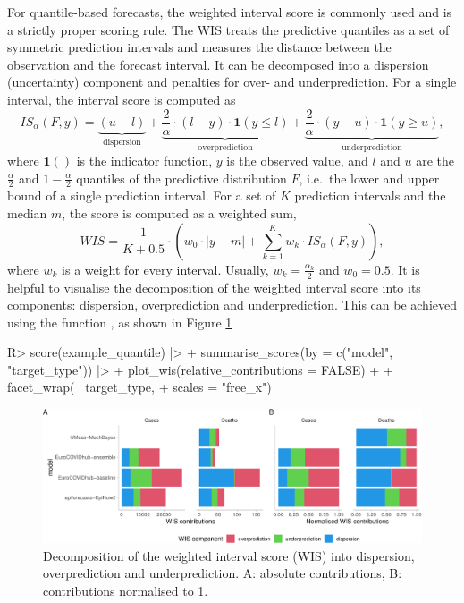 \documentclass[
]{jss}
\begin{document}
For quantile-based forecasts, the weighted interval score
\citep[WIS, ][]{bracherEvaluatingEpidemicForecasts2021} is commonly used
and is a strictly proper scoring rule. The WIS treats the predictive
quantiles as a set of symmetric prediction intervals and measures the
distance between the observation and the forecast interval. It can be
decomposed into a dispersion (uncertainty) component and penalties for
over- and underprediction. For a single interval, the interval score is
computed as
\[IS_\alpha(F,y) = \underbrace{(u-l)}_\text{dispersion} + \underbrace{\frac{2}{\alpha} \cdot (l-y) \cdot \mathbf{1}(y \leq l)}_{\text{overprediction}} + \underbrace{\frac{2}{\alpha} \cdot (y-u) \cdot \mathbf{1}(y \geq u)}_{\text{underprediction}}, \]
where \(\mathbf{1}()\) is the indicator function, \(y\) is the observed
value, and \(l\) and \(u\) are the \(\frac{\alpha}{2}\) and
\(1 - \frac{\alpha}{2}\) quantiles of the predictive distribution \(F\),
i.e.~the lower and upper bound of a single prediction interval. For a
set of \(K\) prediction intervals and the median \(m\), the score is
computed as a weighted sum,
\[WIS = \frac{1}{K + 0.5} \cdot \left(w_0 \cdot |y - m| + \sum_{k = 1}^{K} w_k \cdot IS_{\alpha}(F, y)\right),\]
where \(w_k\) is a weight for every interval. Usually,
\(w_k = \frac{\alpha_k}{2}\) and \(w_0 = 0.5\). It is helpful to
visualise the decomposition of the weighted interval score into its
components: dispersion, overprediction and underprediction. This can be
achieved using the function , as shown in Figure
\ref{fig:wis-components}

\begin{CodeChunk}
\begin{CodeInput}
R> score(example_quantile) |>
+   summarise_scores(by = c("model", "target_type")) |>
+   plot_wis(relative_contributions = FALSE) + 
+   facet_wrap(~ target_type, 
+              scales = "free_x") 
\end{CodeInput}
\end{CodeChunk}

\begin{CodeChunk}
\begin{figure}[!h]

{\centering \includegraphics[width=1\linewidth]{manuscript_files/figure-latex/wis-components-1} 

}

\caption[Decomposition of the weighted interval score (WIS) into dispersion, overprediction and underprediction]{Decomposition of the weighted interval score (WIS) into dispersion, overprediction and underprediction. A: absolute contributions, B: contributions normalised to 1.}\label{fig:wis-components}
\end{figure}
\end{CodeChunk}
\end{document}
